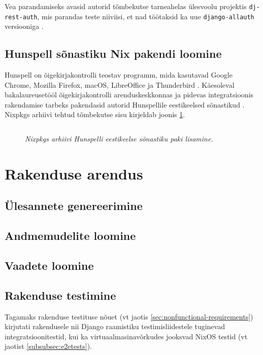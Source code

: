 Vea parandamiseks avasid autorid tõmbekutse tarneahelas ülesvoolu projektis \texttt{dj-rest-auth}, mis parandas teste niiviisi, et nad töötaksid ka uue \texttt{django-allauth} versiooniga \cite{dj-rest-pr}.

\subsection{Hunspell sõnastiku Nix pakendi loomine}

Hunspell on õigekirjakontrolli teostav programm, mida kasutavad Google Chrome, Mozilla Firefox, macOS, LibreOffice ja Thunderbird \cite{hunspell}.
Käesoleval bakalaureusetööl õigekirjakontrolli arenduskeskkonnas ja pidevas integratsioonis rakendamise tarbeks pakendasid autorid Hunspellile eestikeelsed sõnastikud \cite{hunspell-pr}. Nixpkgs arhiivi tehtud tõmbekutse sisu kirjeldab joonis \ref{fig:hunspell-pr}.

\begin{figure}
\inputminted[breaklines]{diff}{chapters/data/hunspell.diff}
\caption{\emph{Nixpkgs arhiivi Hunspelli eestikeelse sõnastiku paki lisamine.}}\label{fig:hunspell-pr}
\end{figure}

\section{Rakenduse arendus}

\subsection{Ülesannete genereerimine}

\subsection{Andmemudelite loomine}

\subsection{Vaadete loomine}

\subsection{Rakenduse testimine}

Tagamaks rakenduse testituse nõuet (vt jaotis \ref{sec:nonfunctional-requirements}) kirjutati rakendusele nii Django raamistiku testimisliidestele \cite{django-testing-api} tuginevad integratsioonitestid, kui ka virtuaalmasinavõrkudes jooksvad NixOS testid \cite{nixos-tests} (vt jaotist \ref{subsubsec:e2etests}).

